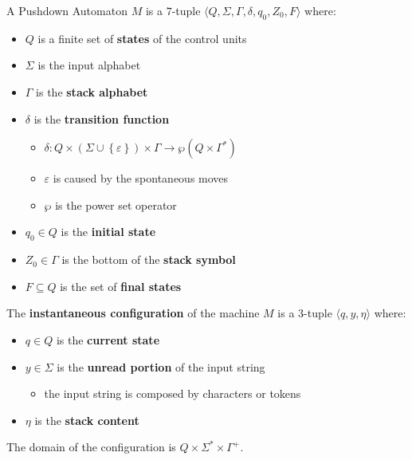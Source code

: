 \documentclass[english]{article}
\begin{document}
\begin{definition}
  \label{def:pushdown-automaton}
  A Pushdown Automaton \(M\) is a \(7\)-tuple \(\langle Q, \Sigma, \Gamma, \delta, q_0, Z_0, F \rangle\) where:

  \begin{itemize}
    \item \(Q\) is a finite set of \textbf{states} of the control units
    \item \(\Sigma\) is the input alphabet
    \item \(\Gamma\) is the \textbf{stack alphabet}
    \item \(\delta\) is the \textbf{transition function}
          \begin{itemize}
            \item \(\delta: Q \times \left( \Sigma \cup \left\{ \varepsilon \right\} \right) \times \Gamma \rightarrow \wp \left( Q \times \Gamma^\ast \right)\)
            \item \(\varepsilon\) is caused by the spontaneous moves
            \item \(\wp\) is the power set operator
          \end{itemize}
    \item \(q_0 \in Q\) is the \textbf{initial state}
    \item \(Z_0 \in \Gamma\) is the bottom of the \textbf{stack symbol}
    \item \(F \subseteq Q\) is the set of \textbf{final states}
  \end{itemize}
\end{definition}

\begin{definition}
  The \textbf{instantaneous configuration} of the machine \(M\) is a \(3\)-tuple \(\langle q, y, \eta \rangle\) where:

  \begin{itemize}
    \item \(q \in Q\) is the \textbf{current state}
    \item \(y \in \Sigma\) is the \textbf{unread portion} of the input string
          \begin{itemize}
            \item the input string is composed by characters or tokens
          \end{itemize}
    \item \(\eta\) is the \textbf{stack content}
  \end{itemize}

  The domain of the configuration is \(Q \times \Sigma^\ast \times \Gamma^+\).
\end{definition}
\end{document}
